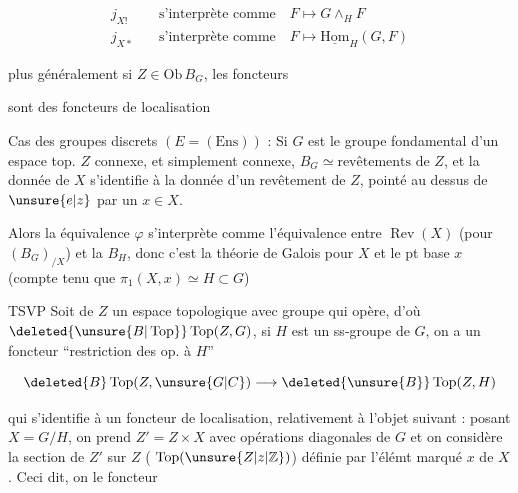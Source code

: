 \[\begin{aligned}j_{X!}&\quad\text{s'interprète comme}\quad F\longmapsto G\wedge_H F\\j_{X*}&\quad\text{s'interprète comme}\quad F\mapsto\underline{\mathrm{Hom}}_H(G,F)\end{aligned}\]

plus généralement si $Z\in\mathrm{Ob}\,B_G$, les foncteurs 


sont des foncteurs de localisation

Cas des groupes discrets $(E=(\mathrm{Ens}))$ : Si $G$ est le groupe fondamental  d'un espace top. $Z$ connexe,  et  simplement connexe, $B_G\simeq\text{revêtements de }Z$,  et la donnée de $X$ s'identifie à la donnée d'un revêtement  de $Z$, pointé au dessus de $\unsure{e|z}$ par un $x\in X$.

Alors la  équivalence $\varphi$  s'interprète  comme l'équivalence entre $\operatorname{Rev}(X)$ (pour $(B_G)_{/X}$) et la  $B_H$, donc c'est la théorie de Galois pour $X$ et le pt base $x$ (compte tenu que $\pi_1(X,x)\simeq H\subset G$)

TSVP
Soit de   $Z$ un espace topologique avec  groupe  qui opère, d'où $\deleted{\unsure{B|\operatorname{Top}}}\operatorname{Top}(Z,G)$, si $H$ est un ss-groupe de $G$, on a un foncteur ``restriction des op. à $H$''

\[\deleted{B}\operatorname{Top}(Z,\unsure{G|C})\longrightarrow\deleted{\unsure{B}}\operatorname{Top}(Z,H)\]

qui s'identifie à un foncteur de localisation, relativement à l'objet  suivant : posant $X=G/H$, on prend $Z'=Z\times X$ avec opérations diagonales de $G$ et on considère la section  de $Z'$ sur $Z$ ( $\operatorname{Top}(\unsure{Z|z|\mathbb Z})$) définie par l'élémt marqué $x$ de $X$. Ceci dit, on  le foncteur

